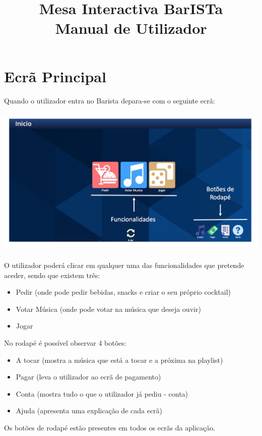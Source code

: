 \documentclass{article}
\title{\vspace{5cm}\textbf{Mesa Interactiva BarISTa}\\Manual de Utilizador}
\begin{document}
\maketitle
\newpage

\tableofcontents
\newpage

\section{Ecrã Principal}
Quando o utilizador entra no Barista depara-se com o seguinte ecrã:\\
\includegraphics[width=15cm, height=8cm]{user_manual_images/chick.png}
O utilizador poderá clicar em qualquer uma das funcionalidades que pretende aceder, sendo que existem três:
\begin{itemize} 
\item Pedir (onde pode pedir bebidas, snacks e criar o seu próprio cocktail)
\item Votar Música  (onde pode votar na música que deseja ouvir)
\item Jogar 
\end{itemize}
No rodapé é possível observar 4 botões:
\begin{itemize} 
\item A tocar (mostra a música que está a tocar e a próxima na playlist)
\item Pagar   (leva o utilizador ao ecrã de pagamento)
\item Conta   (mostra tudo o que o utilizador já pediu - conta)
\item Ajuda   (apresenta uma explicação de cada ecrã)
\end{itemize}
Os botões de rodapé estão presentes em todos os ecrãs da aplicação.
\end{document}
